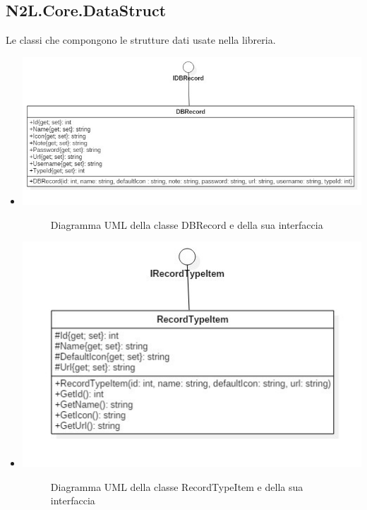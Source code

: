 \documentclass[a4paper,10pt]{report}
\begin{document}
		\subsection{N2L.Core.DataStruct}
			Le classi che compongono le strutture dati usate nella libreria.
			\begin{itemize}
				\item[] {
					\begin{center}
						\includegraphics[width = \textwidth]{immagini/DBRecord.jpg}
						\end{center}
					\begin{figure}[!h]
						\caption{Diagramma UML della classe DBRecord e della sua interfaccia}
						\end{figure}}
				\item[] {
					\begin{center}
						\includegraphics[width = \textwidth]{immagini/RecordTypeItem.jpg}
						\end{center}
					\begin{figure}[!htb]
					\caption{Diagramma UML della classe RecordTypeItem e della sua interfaccia}
					\end{figure}}
				\end{itemize}
		\newpage
\end{document}
